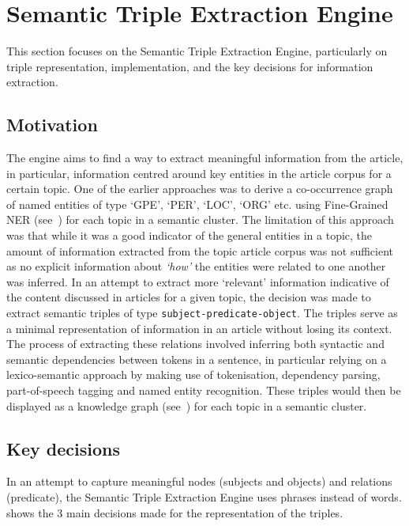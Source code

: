 \chapter{Semantic Triple Extraction Engine}  \label{ch:5:triple}

\vspace{-2ex}
This section focuses on the Semantic Triple Extraction Engine, particularly on triple representation, implementation, and the key decisions for information extraction.

\section{Motivation}
The engine aims to find a way to extract meaningful information from the article, in particular, information centred around key entities in the article corpus for a certain topic. One of the earlier approaches was to derive a co-occurrence graph of named entities of type `GPE', `PER', `LOC', `ORG' etc. using Fine-Grained NER (see~) for each topic in a semantic cluster. The limitation of this approach was that while it was a good indicator of the general entities in a topic, the amount of information extracted from the topic article corpus was not sufficient as no explicit information about \textit{`how'} the entities were related to one another was inferred. In an attempt to extract more `relevant' information indicative of the content discussed in articles for a given topic, the decision was made to extract semantic triples of type \texttt{subject-predicate-object}. The triples serve as a minimal representation of information in an article without losing its context. The process of extracting these relations involved inferring both syntactic and semantic dependencies between tokens in a sentence, in particular relying on a lexico-semantic approach by making use of tokenisation, dependency parsing, part-of-speech tagging and named entity recognition. These triples would then be displayed as a knowledge graph (see~) for each topic in a semantic cluster.

\section{Key decisions} \label{key_decisions_rel}

In an attempt to capture meaningful nodes (subjects and objects) and relations (predicate), the Semantic Triple Extraction Engine uses phrases instead of words.  shows the 3 main decisions made for the representation of the triples. 

